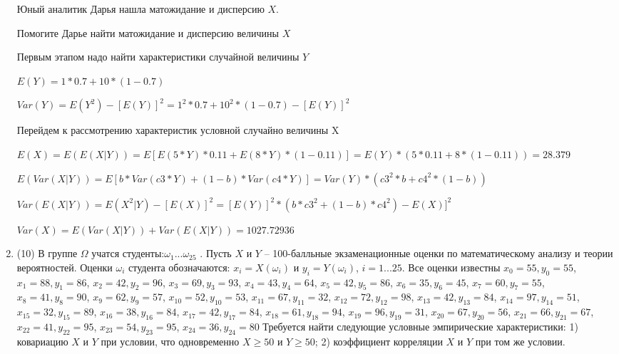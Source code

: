 \documentclass[a4paper,12pt]{article}
\begin{document}
\begin{enumerate}
	Юный аналитик Дарья нашла матожидание и дисперсию $X$.

	Помогите Дарье найти матожидание и дисперсию величины $X$
	


	

	Первым этапом надо найти характеристики случайной величины $Y$

	$E(Y) = 1 * 0.7 + 10 * (1 - 0.7)$

	$Var(Y) = E(Y^2) - [E(Y)]^2 = 1^2 * 0.7 + 10^2 * (1 - 0.7) - [E(Y)]^2$


	Перейдем к рассмотрению характеристик условной случайно величины X

	$E(X) = E(E(X|Y)) = E[E(5 * Y) * 0.11 + E(8 * Y) * (1 - 0.11)] = E(Y) * (5 * 0.11 + 8 * (1 - 0.11)) = 28.379$

	$E(Var(X|Y)) = E[b * Var(c3 * Y) + (1 - b) * Var(c4 * Y)] = Var(Y) * (c3^2 * b + c4^2 * (1- b)) $

	$Var(E(X|Y)) = E(X^2|Y) - [E(X)]^2 = [E(Y)]^2 * (b * c3^2 + (1-b)*c4^2) - E(X)]^2$

	$Var(X) = E(Var(X|Y)) + Var(E(X|Y)) = 1027.72936$
	

\item


(10) В группе $\Omega$ учатся студенты:$\omega _{1}...\omega _{25}$ . Пусть $X$ и $Y$ – 100-балльные экзаменационные оценки по
математическому анализу и теории вероятностей. Оценки $\omega _{i}$ студента обозначаются: $x _{i} = X(\omega _{i})$ и $y _{i} = Y(\omega _{i})$, $i = 1...25$. Все оценки известны
$x _{0} = 55, y _{0} = 55$, $x _{1} = 88, y _{1} = 86$, $x _{2} = 42, y _{2} = 96$, $x _{3} = 69, y _{3} = 93$, $x _{4} = 43, y _{4} = 64$, $x _{5} = 42, y _{5} = 86$, $x _{6} = 35, y _{6} = 45$, $x _{7} = 60, y _{7} = 55$, $x _{8} = 41, y _{8} = 90$, $x _{9} = 62, y _{9} = 57$, $x _{10} = 52, y _{10} = 53$, $x _{11} = 67, y _{11} = 32$, $x _{12} = 72, y _{12} = 98$, $x _{13} = 42, y _{13} = 84$, $x _{14} = 97, y _{14} = 51$, $x _{15} = 32, y _{15} = 89$, $x _{16} = 38, y _{16} = 84$, $x _{17} = 42, y _{17} = 84$, $x _{18} = 61, y _{18} = 94$, $x _{19} = 96, y _{19} = 31$, $x _{20} = 67, y _{20} = 56$, $x _{21} = 66, y _{21} = 67$, $x _{22} = 41, y _{22} = 95$, $x _{23} = 54, y _{23} = 95$, $x _{24} = 36, y _{24} = 80$
Требуется
найти следующие условные эмпирические характеристики: 1) ковариацию $X$ и $Y$ при условии, что одновременно $X \geqslant 50$
 и $Y \geqslant 50$; 2) коэффициент корреляции $X$ и $Y$ при том же условии.





\end{enumerate}
\end{document}
